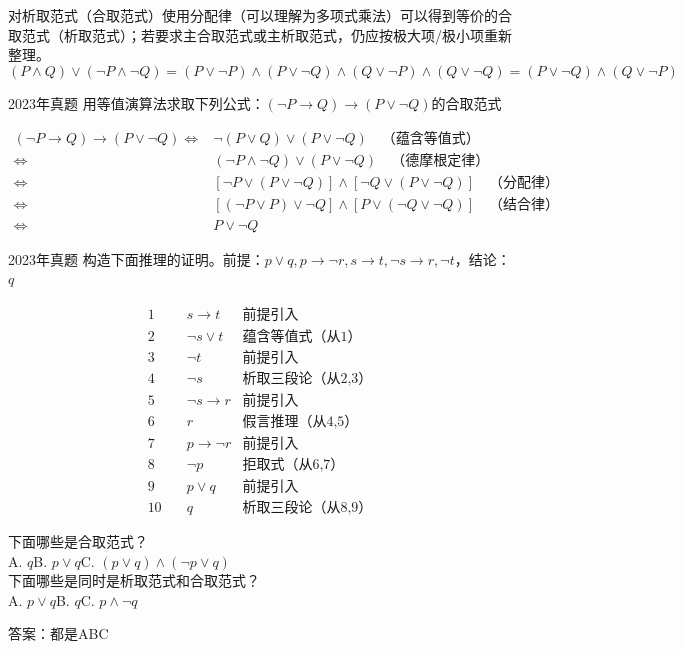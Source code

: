 对析取范式（合取范式）使用分配律（可以理解为多项式乘法）可以得到等价的合取范式（析取范式）；若要求主合取范式或主析取范式，仍应按极大项/极小项重新整理。
\[(P \land Q) \lor (\neg P \land \neg Q) = (P\lor \neg P)\land (P\lor \neg Q)\land (Q\lor \neg P)\land (Q\lor \neg Q)= (P\lor \neg Q)\land (Q\lor \neg P) \]
\begin{example}{2023年真题}{}
    用等值演算法求取下列公式：$(\neg P\to Q)\to(P\lor\neg Q)$的合取范式
\end{example}
\vspace{-30pt}
\begin{align*}
 (\neg P \to Q) \to (P \lor \neg Q) 
\Leftrightarrow &  \neg (P \lor Q) \lor (P \lor \neg Q) \quad \text{（蕴含等值式）} \\
\Leftrightarrow & (\neg P \land \neg Q) \lor (P \lor \neg Q) \quad \text{（德摩根定律）} \\
\Leftrightarrow & [\neg P \lor (P \lor \neg Q)] \land [\neg Q \lor (P \lor \neg Q)] \quad \text{（分配律）} \\
\Leftrightarrow & [(\neg P \lor P) \lor \neg Q] \land [P \lor (\neg Q \lor \neg Q)] \quad \text{（结合律）} \\
\Leftrightarrow & P \lor \neg Q 
\end{align*}
\begin{example}{2023年真题}{}
构造下面推理的证明。前提：$p\lor q, p\to \neg r, s\to t,\neg s\to r, \neg t$，结论：$q$
\end{example}
\vspace{-30pt}
\begin{align*}
1\quad& s\to t&\text{前提引入}\\
2\quad& \neg s\lor t&\text{蕴含等值式（从1）}\\
3\quad& \neg t&\text{前提引入}\\
4\quad& \neg s&\text{析取三段论（从2,3）}\\
5\quad& \neg s\to r&\text{前提引入}\\
6\quad& r&\text{假言推理（从4,5）}\\
7\quad& p\to \neg r&\text{前提引入}\\
8\quad& \neg p&\text{拒取式（从6,7）}\\
9\quad& p\lor q&\text{前提引入}\\
10\quad& q&\text{析取三段论（从8,9）}
\end{align*}
\begin{example}{}{}
    下面哪些是合取范式？\\
    A. $q$\quad B. $p\lor q$\quad C. $(p\lor q)\land(\neg p\lor q)$\\
    下面哪些是同时是析取范式和合取范式？\\
    A. $p\lor q$\quad B. $q$\quad C. $p\land \neg q$
\end{example}
答案：都是ABC
